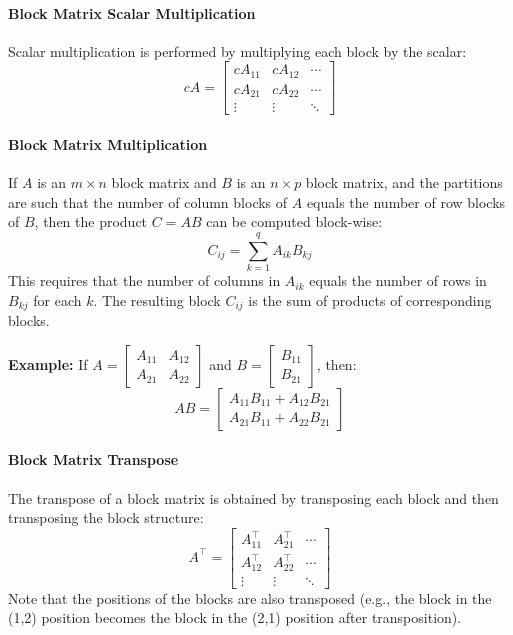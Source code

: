 \paragraph*{Block Matrix Scalar Multiplication}
Scalar multiplication is performed by multiplying each block by the scalar:
\[
cA = \begin{bmatrix}
    cA_{11} & cA_{12} & \cdots \\
    cA_{21} & cA_{22} & \cdots \\
    \vdots & \vdots & \ddots
\end{bmatrix}
\]

\paragraph*{Block Matrix Multiplication}
If \( A \) is an \( m \times n \) block matrix and \( B \) is an \( n \times p \) block matrix, and the partitions are such that the number of column blocks of \( A \) equals the number of row blocks of \( B \), then the product \( C = AB \) can be computed block-wise:
\[
C_{ij} = \sum_{k=1}^{q} A_{ik} B_{kj}
\]
This requires that the number of columns in \( A_{ik} \) equals the number of rows in \( B_{kj} \) for each \( k \). The resulting block \( C_{ij} \) is the sum of products of corresponding blocks.

\textbf{Example:} If \( A = \begin{bmatrix} A_{11} & A_{12} \\ A_{21} & A_{22} \end{bmatrix} \) and \( B = \begin{bmatrix} B_{11} \\ B_{21} \end{bmatrix} \), then:
\[
AB = \begin{bmatrix}
    A_{11}B_{11} + A_{12}B_{21} \\
    A_{21}B_{11} + A_{22}B_{21}
\end{bmatrix}
\]

\paragraph*{Block Matrix Transpose}
The transpose of a block matrix is obtained by transposing each block and then transposing the block structure:
\[
A^\top = \begin{bmatrix}
    A_{11}^\top & A_{21}^\top & \cdots \\
    A_{12}^\top & A_{22}^\top & \cdots \\
    \vdots & \vdots & \ddots
\end{bmatrix}
\]
Note that the positions of the blocks are also transposed (e.g., the block in the (1,2) position becomes the block in the (2,1) position after transposition).

